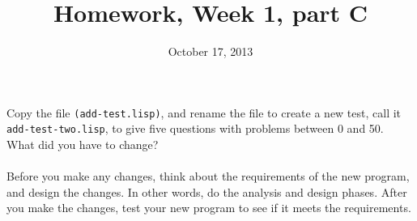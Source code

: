 \documentclass{article}
\title{Homework, Week 1, part C}
\date{October 17, 2013}
\begin{document}
\maketitle{}

\paragraph{}Copy the file \texttt{(add-test.lisp)}, and rename the file to create a new test, call it \texttt{add-test-two.lisp}, to give five questions with problems between 0 and 50. What did you have to change?

\paragraph{} Before you make any changes, think about the requirements of the new program, and design the changes. In other words, do the analysis and design phases. After you make the changes, test your new program to see if it meets the requirements.
\end{document}
